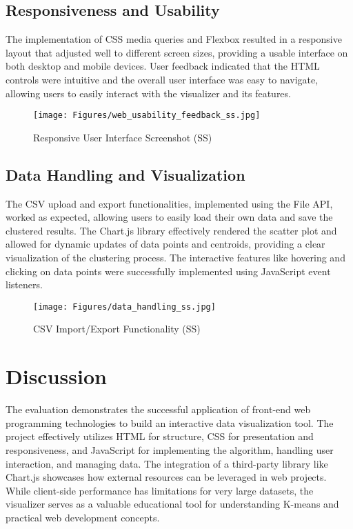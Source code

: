 \documentclass[12pt]{report}
\begin{document}
\subsection{Responsiveness and Usability}
The implementation of CSS media queries and Flexbox resulted in a responsive layout that adjusted well to different screen sizes, providing a usable interface on both desktop and mobile devices. User feedback indicated that the HTML controls were intuitive and the overall user interface was easy to navigate, allowing users to easily interact with the visualizer and its features.
\begin{figure}[h]
        \centering
        \texttt{[image: Figures/web\_usability\_feedback\_ss.jpg]}
        \caption{Responsive User Interface Screenshot (SS)}
\end{figure}
\subsection{Data Handling and Visualization}
The CSV upload and export functionalities, implemented using the File API, worked as expected, allowing users to easily load their own data and save the clustered results. The Chart.js library effectively rendered the scatter plot and allowed for dynamic updates of data points and centroids, providing a clear visualization of the clustering process. The interactive features like hovering and clicking on data points were successfully implemented using JavaScript event listeners.
\begin{figure}[h]
        \centering
        \texttt{[image: Figures/data\_handling\_ss.jpg]}
        \caption{CSV Import/Export Functionality (SS)}
\end{figure}
\section{Discussion}
The evaluation demonstrates the successful application of front-end web programming technologies to build an interactive data visualization tool. The project effectively utilizes HTML for structure, CSS for presentation and responsiveness, and JavaScript for implementing the algorithm, handling user interaction, and managing data. The integration of a third-party library like Chart.js showcases how external resources can be leveraged in web projects. While client-side performance has limitations for very large datasets, the visualizer serves as a valuable educational tool for understanding K-means and practical web development concepts.
\end{document}

